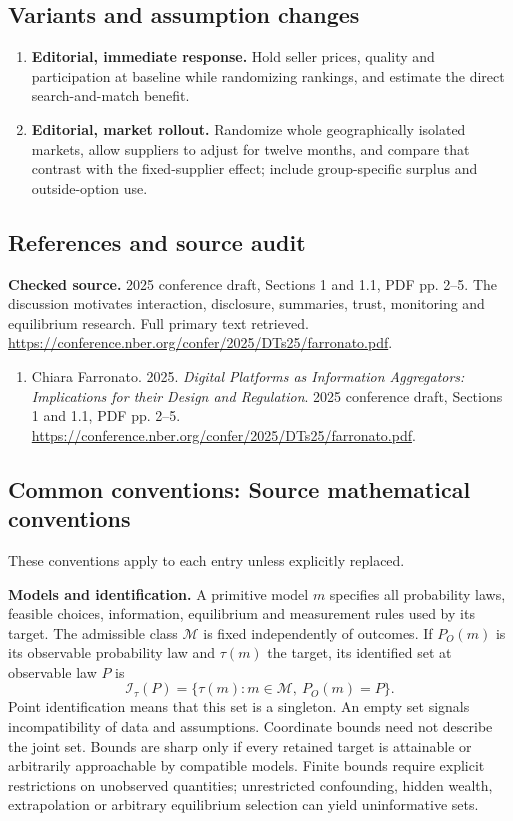 \documentclass[11pt,a4paper]{article}
\begin{document}
\subsection*{Variants and assumption changes}
\begin{enumerate}
\item \textbf{Editorial, immediate response.} Hold seller prices, quality and participation at baseline while randomizing rankings, and estimate the direct search-and-match benefit.
\item \textbf{Editorial, market rollout.} Randomize whole geographically isolated markets, allow suppliers to adjust for twelve months, and compare that contrast with the fixed-supplier effect; include group-specific surplus and outside-option use.
\end{enumerate}
\subsection*{References and source audit}
\textbf{Checked source.} 2025 conference draft, Sections 1 and 1.1, PDF pp. 2--5. The discussion motivates interaction, disclosure, summaries, trust, monitoring and equilibrium research. Full primary text retrieved. \url{https://conference.nber.org/confer/2025/DTs25/farronato.pdf}.
\begin{enumerate}\raggedright
\item\hypertarget{definitions:source:30007682:1}{} Chiara Farronato. 2025. \emph{Digital Platforms as Information Aggregators: Implications for their Design and Regulation}. 2025 conference draft, Sections 1 and 1.1, PDF pp. 2--5.
\url{https://conference.nber.org/confer/2025/DTs25/farronato.pdf}.
\end{enumerate}

\subsection*{Common conventions: Source mathematical conventions}

These conventions apply to each entry unless explicitly replaced.

\textbf{Models and identification.} A primitive model \(m\) specifies all probability laws, feasible choices, information, equilibrium and measurement rules used by its target. The admissible class \(\mathcal M\) is fixed independently of outcomes. If \(P_O(m)\) is its observable probability law and \(\tau(m)\) the target, its identified set at observable law \(P\) is
\[
 \mathcal I_\tau(P)=\{\tau(m):m\in\mathcal M,\ P_O(m)=P\}.
\]
Point identification means that this set is a singleton. An empty set signals incompatibility of data and assumptions. Coordinate bounds need not describe the joint set. Bounds are sharp only if every retained target is attainable or arbitrarily approachable by compatible models. Finite bounds require explicit restrictions on unobserved quantities; unrestricted confounding, hidden wealth, extrapolation or arbitrary equilibrium selection can yield uninformative sets.
\end{document}
